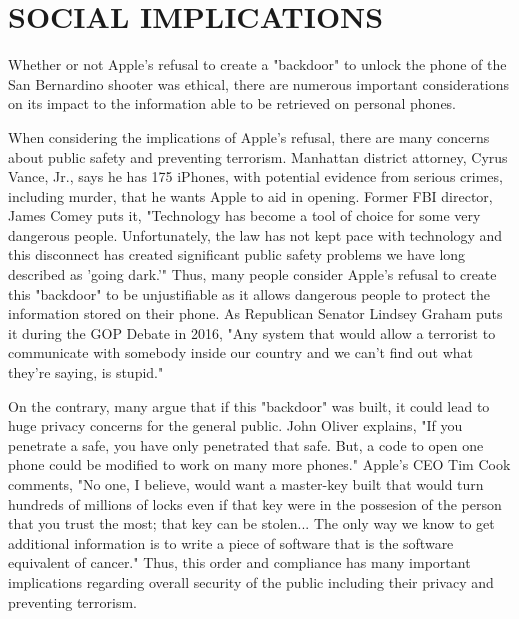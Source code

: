 \section{SOCIAL IMPLICATIONS}
Whether or not Apple's refusal to create a "backdoor" to unlock the phone of the San Bernardino shooter was ethical, there are numerous important considerations on its impact to the information able to be retrieved on personal phones.\par

When considering the implications of Apple's refusal, there are many concerns about public safety and preventing terrorism. Manhattan district attorney, Cyrus Vance, Jr., says he has 175 iPhones, with potential evidence from serious crimes, including murder, that he wants Apple to aid in opening.\cite{Manhattan-da} Former FBI director, James Comey puts it, "Technology has become a tool of choice for some very dangerous people. Unfortunately, the law has not kept pace with technology and this disconnect has created significant public safety problems we have long described as 'going dark.'"\cite{brookings} Thus, many people consider Apple's refusal to create this "backdoor" to be unjustifiable as it allows dangerous people to protect the information stored on their phone. As Republican Senator Lindsey Graham puts it during the GOP Debate in 2016, "Any system that would allow a terrorist to communicate with somebody inside our country and we can't find out what they're saying, is stupid."\cite{CNN-GOP-Debate}\par

On the contrary, many argue that if this "backdoor" was built, it could lead to huge privacy concerns for the general public. John Oliver explains, "If you penetrate a safe, you have only penetrated that safe. But, a code to open one phone could be modified to work on many more phones."\cite{John-Oliver} Apple's CEO Tim Cook comments, "No one, I believe, would want a master-key built that would turn hundreds of millions of locks even if that key were in the possesion of the person that you trust the most; that key can be stolen... The only way we know to get additional information is to write a piece of software that is the software equivalent of cancer."\cite{ABC-TimCook} Thus, this order and compliance has many important implications regarding overall security of the public including their privacy and preventing terrorism.
